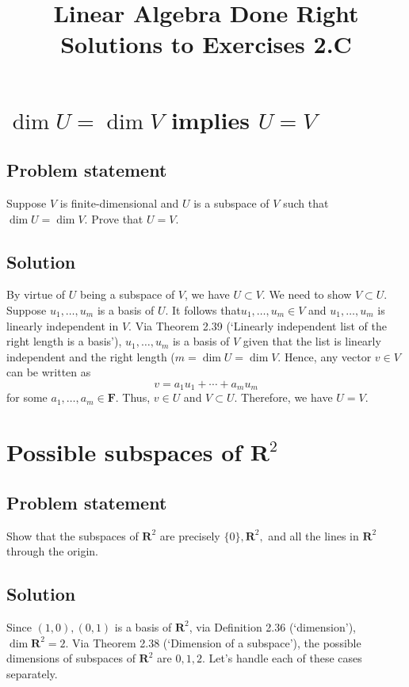 \documentclass{article}
\title{Linear Algebra Done Right\\Solutions to Exercises 2.C}
\author{}
\date{}
\begin{document}
\maketitle

\section{$\operatorname{dim}U=\operatorname{dim}V$ implies $U=V$}
\subsection*{Problem statement}
Suppose $V$ is finite-dimensional and $U$ is a subspace of $V$ such that\newline $\operatorname{dim}U=\operatorname{dim}V$. 
Prove that $U=V$.

\subsection*{Solution}
By virtue of $U$ being a subspace of $V$, we have $U\subset V$. 
We need to show $V\subset U$. 
Suppose $u_1,\ldots,u_m$ is a basis of $U$. 
It follows that\newline $u_1,\ldots,u_m\in V$ and $u_1,\ldots,u_m$ is linearly independent in $V$. 
Via Theorem 2.39 (`Linearly independent list of the right length is a basis'), $u_1,\ldots,u_m$ is a basis of $V$ given that the list is linearly independent and the right length ($m=\operatorname{dim}U=\operatorname{dim}V$. 
Hence, any vector $v\in V$ can be written as
\[v=a_1u_1+\cdots+a_mu_m\]
for some $a_1,\ldots,a_m\in\mathbf{F}$. 
Thus, $v\in U$ and $V\subset U$. 
Therefore, we have $U=V$.

\clearpage

\section{Possible subspaces of $\mathbf{R}^2$}
\subsection*{Problem statement}
Show that the subspaces of $\mathbf{R}^2$ are precisely $\{0\},\mathbf{R}^2,$ and all the lines in $\mathbf{R}^2$ through the origin.

\subsection*{Solution}
Since $(1,0),(0,1)$ is a basis of $\mathbf{R}^2$, via Definition 2.36 (`dimension'),\newline $\operatorname{dim}\mathbf{R}^2=2$. 
Via Theorem 2.38 (`Dimension of a subspace'), the possible dimensions of subspaces of $\mathbf{R}^2$ are $0,1,2$. 
Let's handle each of these cases separately.
\end{document}
